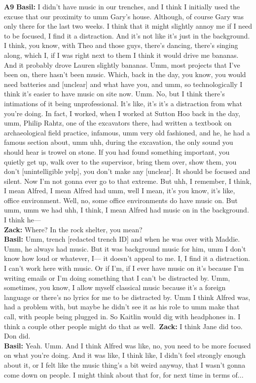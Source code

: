 \documentclass{article}
\begin{document}
\noindent\textbf{A9}\label{sec-A9}\newline
\textbf{Basil:} I didn't have music in our trenches, and I think I
initially used the excuse that our proximity to umm Gary's house.
Although, of course Gary was only there for the last two weeks. I think
that it might slightly annoy me if I need to be focused, I find it a
distraction. And it's not like it's just in the background. I think, you
know, with Theo and those guys, there's dancing, there's singing along,
which I, if I was right next to them I think it would drive me bananas.
And it probably drove Lauren slightly bananas. Umm, most projects that
I've been on, there hasn't been music. Which, back in the day, you know,
you would need batteries and {[}unclear{]} and what have you, and umm,
so technologically I think it's easier to have music on site now. Umm.
No, but I think there's intimations of it being unprofessional. It's
like, it's it's a distraction from what you're doing. In fact, I worked,
when I worked at Sutton Hoo back in the day, umm, Philip Rahtz, one of
the excavators there, had written a textbook on archaeological field
practice, infamous, umm very old fashioned, and he, he had a famous
section about, umm uhh, during the excavation, the only sound you should
hear is trowel on stone. If you had found something important, you
quietly get up, walk over to the supervisor, bring them over, show them,
you don't {[}unintelligible yelp{]}, you don't make any {[}unclear{]}.
It should be focused and silent. Now I'm not gonna ever go to that
extreme. But uhh, I remember, I think, I mean Alfred, I mean Alfred had
umm, well I mean, it's you know, it's like, office environment. Well,
no, some office environments do have music on. But umm, umm we had uhh,
I think, I mean Alfred had music on in the background. I think he---\\
\textbf{Zack:} Where? In the rock shelter, you mean?\\
\textbf{Basil:} Umm, trench {[}redacted trench ID{]} and when he was
over with Maddie. Umm, he always had music. But it was background music
for him, umm I don't know how loud or whatever, I--- it doesn't appeal
to me. I, I find it a distraction. I can't work here with music. Or if
I'm, if I ever have music on it's because I'm writing emails or I'm
doing something that I can't be distracted by. Umm, sometimes, you know,
I allow myself classical music because it's a foreign language or
there's no lyrics for me to be distracted by. Umm I think Alfred was,
had a problem with, but maybe he didn't see it as his role to umm make
that call, with people being plugged in. So Kaitlin would dig with
headphones in. I think a couple other people might do that as
well.~\textbf{Zack:} I think Jane did too. Don did.\\
\textbf{Basil:} Yeah. Umm. And I think Alfred was like, no, you need to
be more focused on what you're doing. And it was like, I think like, I
didn't feel strongly enough about it, or I felt like the music thing's a
bit weird anyway, that I wasn't gonna come down on people. I might think
about that for, for next time in terms of...\newline
\end{document}
